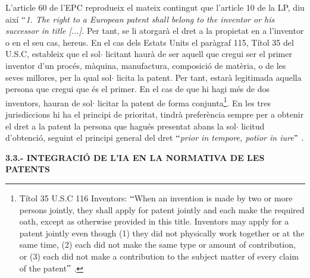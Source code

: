 \documentclass[12pt]{article}
\begin{document}
\vspace{\baselineskip}
\begin{justify}
L’article 60 de l’EPC reprodueix el mateix contingut que l’article 10 de la LP, diu així $``$\textit{1. The right to a European patent shall belong to the inventor or his successor in title [...]. }Per tant, se li atorgarà el dret a la propietat en a l’inventor o en el seu cas, hereus. En el cas dels Estats Units el paràgraf 115, Títol 35 del U.S.C, estableix que el sol$ \cdot $ licitant haurà de ser aquell que cregui ser el primer inventor d’un procés, màquina, manufactura, composició de matèria, o de les seves millores, per la qual sol$ \cdot $ licita la patent. Per tant, estarà legitimada aquella persona que cregui que és el primer. En el cas de que hi hagi més de dos inventors, hauran de sol$ \cdot $ licitar la patent de forma conjunta\footnote{ Títol 35 U.S.C 116 Inventors: $``$When an invention is made by two or more persons jointly, they shall apply for patent jointly and each make the required oath, except as otherwise provided in this title. Inventors may apply for a patent jointly even though (1) they did not physically work together or at the same time, (2) each did not make the same type or amount of contribution, or (3) each did not make a contribution to the subject matter of every claim of the patent$"$ . }.  En les tres jurisdiccions hi ha el principi de prioritat, tindrà preferència sempre per a obtenir el dret a la patent la persona que hagués presentat abans la sol$ \cdot $ licitud d’obtenció, seguint el principi general del dret $``$\textit{prior in tempore, potior in iure$"$ .}
\end{justify}\par


\vspace{\baselineskip}
\begin{justify}
\textbf{3.3.- INTEGRACIÓ DE L’IA EN LA NORMATIVA DE LES PATENTS}
\end{justify}\par
\end{document}

